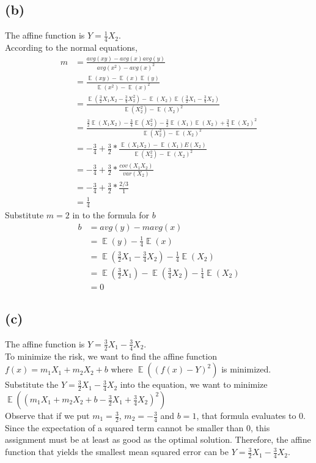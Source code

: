 \documentclass[11pt]{article}
\DeclareMathOperator{\E}{\mathbb{E}}
\begin{document}
\subsection*{(b)}
The affine function is $Y=\frac{1}{4}X_2$.\\
According to the normal equations,
\begin{equation}
    \begin{split}
        m &= \frac{avg(xy)-avg(x) avg(y)}{avg(x^2)-avg(x)^2} \\
        &= \frac{\E(xy)-\E(x)\E(y)}{\E(x^2)-\E(x)^2}\\
        &= \frac{\E(\frac{3}{2}X_1X_2-\frac{3}{4}X_2^2)-\E(X_2)\E(\frac{3}{2}X_1-\frac{3}{4}X_2)}{\E(X_2^2)-\E(X_2)^2} \\
        &= \frac{\frac{3}{2}\E(X_1X_2)-\frac{3}{4}\E(X_2^2)-\frac{3}{2}\E (X_1)\E(X_2)+\frac{3}{4}\E(X_2)^2}{\E(X_2^2)-\E(X_2)^2} \\
        &= -\frac{3}{4} + \frac{3}{2} * \frac{\E(X_1X_2)-\E(X_1)E(X_2)}{\E(X_2^2)-\E(X_2)^2} \\
        &= -\frac{3}{4} + \frac{3}{2} * \frac{cov(X_1X_2)}{var(X_2)} \\
        &= -\frac{3}{4} + \frac{3}{2} * \frac{2/3}{1} \\
        &= \frac{1}{4}
    \end{split}
\end{equation}
Substitute $m=2$ in to the formula for $b$
\begin{equation}
    \begin{split}
        b &= avg(y)-m avg(x) \\
        &= \E(y) - \frac{1}{4}\E(x) \\
        &= \E(\frac{3}{2}X_1-\frac{3}{4}X_2) - \frac{1}{4} \E(X_2) \\
        &= \E (\frac{3}{2}X_1) - \E (\frac{3}{4}X_2) - \frac{1}{4} \E(X_2) \\
        &= 0
    \end{split}
\end{equation}

\subsection*{(c)}
The affine function is $Y=\frac{3}{2}X_1-\frac{3}{4}X_2$.\\
To minimize the risk, we want to find the affine function $f(x)=m_1 X_1 + m_2 X_2 + b$ where $\E((f(x)-Y)^2)$ is minimized. \\
Substitute the $Y=\frac{3}{2}X_1-\frac{3}{4}X_2$ into the equation, we want to minimize $\E((m_1 X_1 + m_2 X_2 + b-\frac{3}{2}X_1+\frac{3}{4}X_2)^2)$ \\
Observe that if we put $m_1=\frac{3}{2}$, $m_2= -\frac{3}{4}$ and $b=1$, that formula evaluates to $0$. Since the expectation of a squared term cannot be smaller than $0$, this assignment must be at least as good as the optimal solution. Therefore, the affine function that yields the smallest mean squared error can be $Y=\frac{3}{2}X_1-\frac{3}{4}X_2$. 
\end{document}
